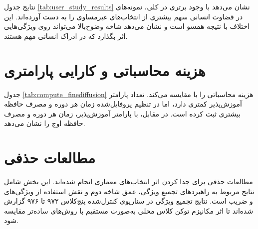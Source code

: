 نتایج جدول \ref{tab:user_study_results} نشان می‌دهد با وجود برتری  در  کلی، نمونه‌های  در قضاوت انسانی سهم بیشتری از انتخاب‌های غیرمساوی را به دست آورده‌اند. این اختلاف با نتیجه  همسو است و نشان می‌دهد شاخه وضوح‌بالا می‌تواند روی ویژگی‌هایی اثر بگذارد که در ادراک انسانی مهم هستند.

\section{هزینه محاسباتی و کارایی پارامتری}
جدول \ref{tab:compute_finediffusion} هزینه محاسباتی  را با  مقایسه می‌کند.  تعداد پارامتر آموزش‌پذیر کمتری دارد، اما در تنظیم پروفایل‌شده زمان هر دوره و مصرف حافظه بیشتری ثبت کرده است. در مقابل،  با  پارامتر آموزش‌پذیر، زمان هر دوره  و مصرف حافظه اوج  را نشان می‌دهد.

\begin{table}[htbp]
    \centering
    \caption[مقایسه هزینه محاسباتی]{مقایسه هزینه محاسباتی و حافظه‌ای  و  در تولید $256 \times 256$ \cite{Pan2024FineDiffusion}.}
    \label{tab:compute_finediffusion}
    \begin{latin}
    \footnotesize
    \end{latin}
\end{table}

\section{مطالعات حذفی}
مطالعات حذفی برای جدا کردن اثر انتخاب‌های معماری انجام شده‌اند. این بخش شامل نتایج مربوط به راهبردهای تجمیع ویژگی، عمق شاخه دوم و نقش استفاده از ویژگی‌های  و ضریب  است. نتایج تجمیع ویژگی در سناریوی کنترل‌شده پنج‌کلاس ۹۷۲ تا ۹۷۶ گزارش شده‌اند تا اثر مکانیزم توکن کلاس محلی به‌صورت مستقیم با روش‌های ساده‌تر مقایسه شود.

